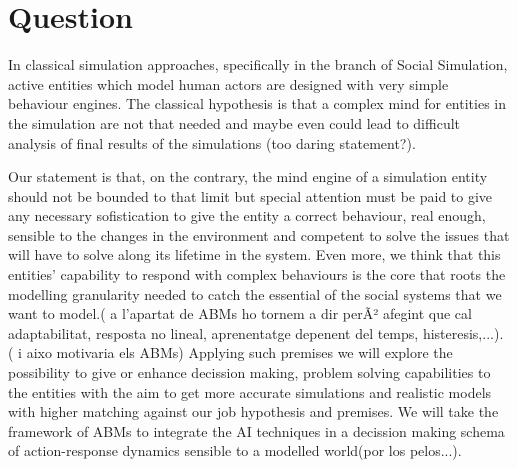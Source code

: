 \documentclass{report}
\begin{document}
%
%
%
%
%
%
%
\section{Question} 

In classical simulation approaches, specifically in the branch of Social Simulation, active entities which model human actors are designed with very simple behaviour engines. The classical hypothesis is that a complex mind for entities in the simulation are not that needed and maybe even could lead to difficult analysis of final results of the simulations (too daring statement?). 

Our statement is that, on the contrary, the mind engine of a simulation entity should not be bounded to that limit but special attention must be paid to give any necessary sofistication to give the entity a correct behaviour, real enough, sensible to the changes in the environment and competent to solve the issues that will have to solve along its lifetime in the system. Even more, we think that this entities' capability to respond with complex behaviours is the core that roots the modelling granularity needed to catch the essential of the social systems that we want to model.( a l'apartat de ABMs ho tornem a dir perÃ² afegint que cal adaptabilitat, resposta no lineal, aprenentatge depenent del temps, histeresis,...).\\
( i aixo motivaria els ABMs) Applying such premises we will explore the possibility to give or enhance decission
making, problem solving capabilities to the entities with the aim to get more accurate simulations and realistic models with higher matching against our job hypothesis and premises. We will take the framework of ABMs to integrate the AI techniques in a decission making schema of action-response dynamics sensible to a modelled world(por los pelos...).\\
\end{document}
